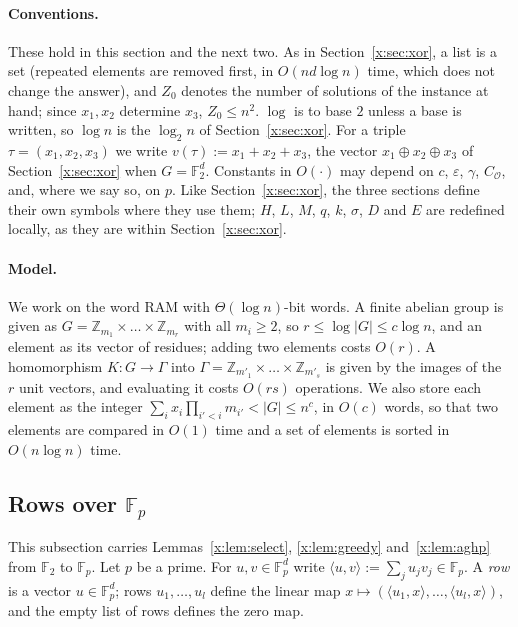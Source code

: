 \documentclass[11pt]{article}
\theoremstyle{definition}
\theoremstyle{remark}
\newcommand{\Z}{\mathbb{Z}}
\newcommand{\F}{\mathbb{F}_2}
\newcommand{\Fp}{\mathbb{F}_p}
\newcommand{\eps}{\varepsilon}
\begin{document}
\paragraph{Conventions.} These hold in this section and the next two. As in Section~\ref{x:sec:xor}, a list is a set (repeated elements are removed first, in $O(nd\log n)$ time, which does not change the answer), and $Z_0$ denotes the number of solutions of the instance at hand; since $x_1,x_2$ determine $x_3$, $Z_0\le n^2$. $\log$ is to base $2$ unless a base is written, so $\log n$ is the $\log_2n$ of Section~\ref{x:sec:xor}. For a triple $\tau=(x_1,x_2,x_3)$ we write $v(\tau):=x_1+x_2+x_3$, the vector $x_1\oplus x_2\oplus x_3$ of Section~\ref{x:sec:xor} when $G=\F^d$. Constants in $O(\cdot)$ may depend on $c$, $\eps$, $\gamma$, $C_{\mathcal O}$, and, where we say so, on $p$. Like Section~\ref{x:sec:xor}, the three sections define their own symbols where they use them; $H$, $L$, $M$, $q$, $k$, $\sigma$, $D$ and $E$ are redefined locally, as they are within Section~\ref{x:sec:xor}.

\paragraph{Model.} We work on the word RAM with $\Theta(\log n)$-bit words. A finite abelian group is given as $G=\Z_{m_1}\times\dots\times\Z_{m_r}$ with all $m_i\ge2$, so $r\le\log|G|\le c\log n$, and an element as its vector of residues; adding two elements costs $O(r)$. A homomorphism $K\colon G\to\Gamma$ into $\Gamma=\Z_{m'_1}\times\dots\times\Z_{m'_s}$ is given by the images of the $r$ unit vectors, and evaluating it costs $O(rs)$ operations. We also store each element as the integer $\sum_ix_i\prod_{i'<i}m_{i'}<|G|\le n^c$, in $O(c)$ words, so that two elements are compared in $O(1)$ time and a set of elements is sorted in $O(n\log n)$ time.

\subsection{Rows over \texorpdfstring{$\Fp$}{Fp}}\label{g:sec:rows}

This subsection carries Lemmas~\ref{x:lem:select}, \ref{x:lem:greedy} and~\ref{x:lem:aghp} from $\F$ to $\Fp$. Let $p$ be a prime. For $u,v\in\Fp^d$ write $\langle u,v\rangle:=\sum_ju_jv_j\in\Fp$. A \emph{row} is a vector $u\in\Fp^d$; rows $u_1,\dots,u_l$ define the linear map $x\mapsto(\langle u_1,x\rangle,\dots,\langle u_l,x\rangle)$, and the empty list of rows defines the zero map.
\end{document}
